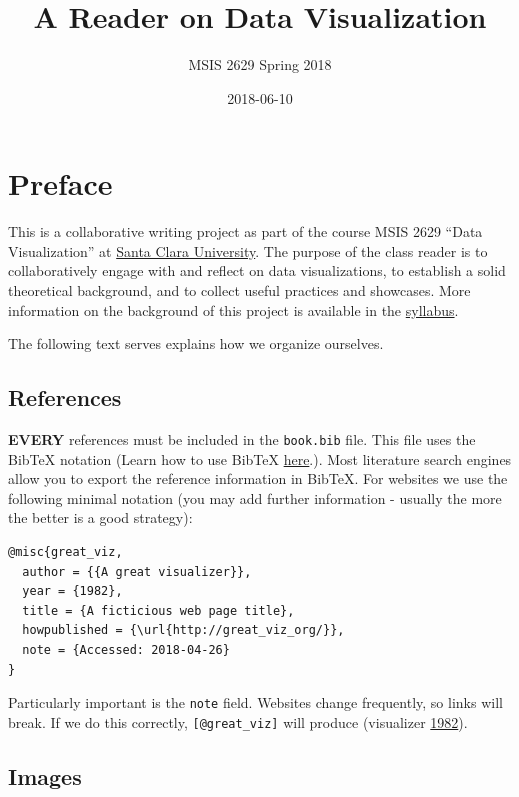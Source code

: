 \documentclass[]{book}
\title{A Reader on Data Visualization}
\author{MSIS 2629 Spring 2018}
\date{2018-06-10}
\theoremstyle{definition}
\theoremstyle{definition}
\theoremstyle{definition}
\theoremstyle{remark}
\begin{document}
\maketitle

{
\setcounter{tocdepth}{1}
\tableofcontents
}
\chapter{Preface}\label{preface}

This is a collaborative writing project as part of the course MSIS 2629
``Data Visualization'' at \href{http://www.scu.edu}{Santa Clara
University}. The purpose of the class reader is to collaboratively
engage with and reflect on data visualizations, to establish a solid
theoretical background, and to collect useful practices and showcases.
More information on the background of this project is available in the
\href{https://mschermann.github.io/msis2629spring2018}{syllabus}.

The following text serves explains how we organize ourselves.

\section{References}\label{references}

\textbf{EVERY} references must be included in the \texttt{book.bib}
file. This file uses the BibTeX notation (Learn how to use BibTeX
\href{http://www.bibtex.org/Using/}{here}.). Most literature search
engines allow you to export the reference information in BibTeX. For
websites we use the following minimal notation (you may add further
information - usually the more the better is a good strategy):

\begin{verbatim}
@misc{great_viz,
  author = {{A great visualizer}},
  year = {1982},
  title = {A ficticious web page title},
  howpublished = {\url{http://great_viz_org/}},
  note = {Accessed: 2018-04-26}
}
\end{verbatim}

Particularly important is the \texttt{note} field. Websites change
frequently, so links will break. If we do this correctly,
\texttt{{[}@great\_viz{]}} will produce (visualizer
\protect\hyperlink{ref-great_viz}{1982}).

\section{Images}\label{images}
\end{document}
